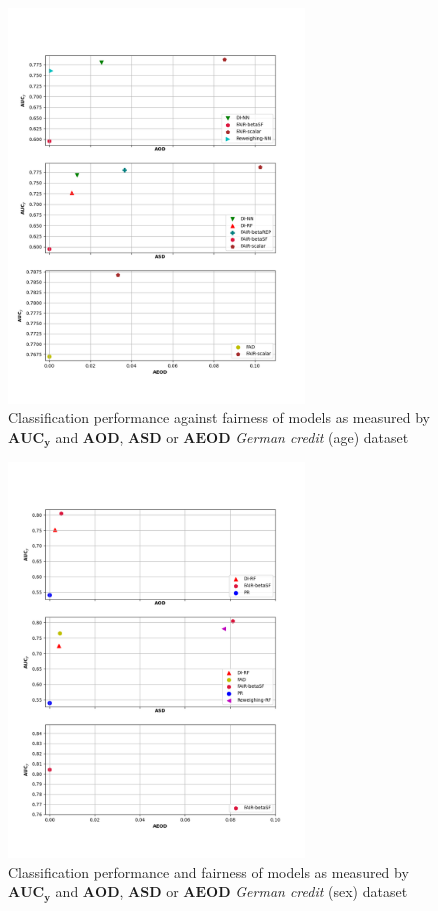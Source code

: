 \documentclass[preprint,12pt]{elsarticle}
\begin{document}
\begin{figure}
	\center
	\includegraphics[angle=0, width=0.7\textwidth]{Ger_age.png}
	\captionsetup{justification=centering}
	\caption{Classification performance against fairness of models as measured by $\mathbf{AUC_y}$ and $\mathbf{AOD}$, $\mathbf{ASD}$ or $\mathbf{AEOD}$ \textit{German credit} (age) dataset}
	\label{fig:Ger-age-res}
	\vskip -0.2in
\end{figure}

\begin{figure}
	\center
	\includegraphics[angle=0, width=0.7\textwidth]{Ger_sex.png}
	\captionsetup{justification=centering}
	\caption{Classification performance and fairness of models as measured by $\mathbf{AUC_y}$ and $\mathbf{AOD}$, $\mathbf{ASD}$ or $\mathbf{AEOD}$ \textit{German credit} (sex) dataset}
	\label{fig:Ger-sex-res}
	\vskip -0.2in
\end{figure}
\end{document}
